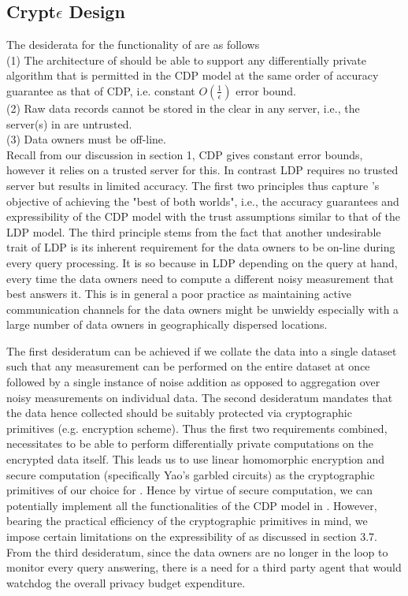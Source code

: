 \subsection{Crypt$\epsilon$ Design}
The  desiderata for  the functionality of \system are as follows\\
(1) The architecture of \system should be able to support any differentially private algorithm that is permitted in the \textsf{CDP} model at the same order of accuracy guarantee as that of \textsf{CDP}, i.e. constant $O(\frac{1}{\epsilon})$ error bound.\\
(2) Raw data records cannot be stored in the clear in any server, i.e., the server(s) in \system are untrusted. \\
(3) Data owners must be  off-line.\\
Recall from our discussion in section 1, \textsf{CDP} gives constant error bounds, however it relies on a trusted server for this. In contrast \textsf{LDP} requires no trusted server but results in limited accuracy.  The first two principles thus capture \system's objective of achieving the "best of both worlds", i.e., the accuracy guarantees and expressibility of the \textsf{CDP} model with the trust assumptions similar to that of the \textsf{LDP} model. The third principle stems from the fact that another undesirable trait of \textsf{LDP} is its inherent requirement for the data owners to be on-line during every query processing.  It is so because  in \textsf{LDP} %
depending on the query at hand, every time the data owners need to compute a different noisy measurement that best answers it. This is in general a poor practice as maintaining active communication channels for the data owners might be unwieldy especially with a large number of data owners in geographically dispersed locations. \par The first desideratum can be achieved if we collate the data into a single dataset such that any measurement can be performed on the entire dataset at once followed by a single instance of noise addition as opposed to aggregation over noisy measurements on individual data. The second desideratum mandates that the data hence collected should be suitably protected via cryptographic primitives (e.g. encryption scheme). Thus the first two requirements combined, necessitates \system to be able to perform differentially private computations on the encrypted data itself. This leads us to use linear homomorphic encryption and secure computation (specifically Yao's garbled circuits)  as the cryptographic primitives of our choice for \system. Hence by virtue of secure computation, we can potentially implement all the functionalities of the \textsf{CDP} model in \system. However, bearing the practical efficiency of the cryptographic primitives in mind, we impose certain limitations on the expressibility of \system as discussed in section 3.7.  From the third desideratum, since the data owners are no longer in the loop to monitor every query answering, there is a need for a third party agent that would watchdog the overall privacy budget expenditure. 
